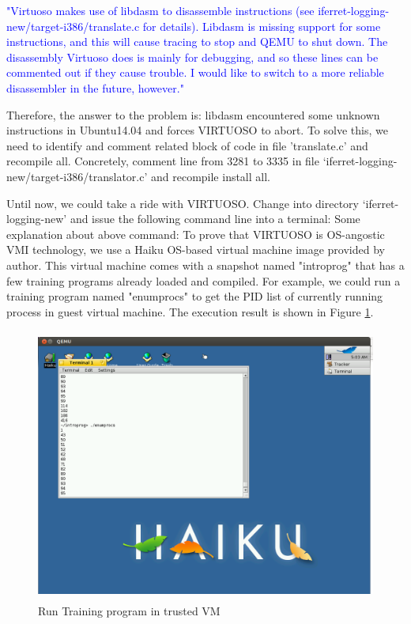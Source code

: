 \textcolor{blue}{
  "Virtuoso makes use of libdasm to disassemble instructions (see iferret-logging-new/target-i386/translate.c for details). 
  Libdasm is missing support for some instructions, and this will cause tracing to stop and QEMU to shut down. The disassembly Virtuoso does 
  is mainly for debugging, and so these lines can be commented out if they cause trouble. I would like to switch to a more reliable disassembler 
  in the future, however."
}

Therefore, the answer to the problem is: libdasm encountered some unknown instructions in Ubuntu14.04 and forces VIRTUOSO to abort. 
To solve this, we need to identify and comment related block of code in file 'translate.c' and recompile all. Concretely, comment line 
from 3281 to 3335 in file ‘iferret-logging-new/target-i386/translator.c’ and recompile install all. 

Until now, we could take a ride with VIRTUOSO. Change into directory ‘iferret-logging-new’ and issue the following command line into a 
terminal:
Some explanation about above command: To prove that VIRTUOSO is OS-angostic VMI technology, we use a Haiku OS-based virtual machine image provided
by author. This virtual machine comes with a snapshot named "introprog" that has a few training programs already loaded and compiled. 
For example, we could run a training program named "enumprocs" to get the PID list of currently running process in guest virtual machine.
The execution result is shown in Figure \ref{fig:Run Training program in trusted VM}.
\begin{figure}[htbp]
	\centering
		\includegraphics[width=14cm, height= 9cm ]{Figures/Figure36.png}
	\caption[Run Training program in trusted VM]{Run Training program in trusted VM}
	\label{fig:Run Training program in trusted VM}
\end{figure}

